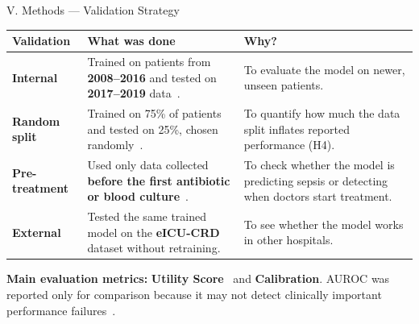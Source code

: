 \begin{frame}{V. Methods --- Validation Strategy}
\tablestyle
\begin{center}
\begin{tabular}{p{2cm}p{6cm}p{4.5cm}}
\toprule
\textbf{Validation} & \textbf{What was done} & \textbf{Why?} \\
\midrule
\textbf{Internal}
  & Trained on patients from \textbf{2008--2016} and tested on
    \textbf{2017--2019} data~\cite{guo2022temporal}.
  & To evaluate the model on newer, unseen patients. \\[3pt]
\textbf{Random split}
  & Trained on 75\% of patients and tested on 25\%, chosen
    randomly~\cite{guo2022temporal}.
  & To quantify how much the data split inflates reported
    performance (H4). \\[3pt]
\textbf{Pre-treatment}
  & Used only data collected \textbf{before the first antibiotic or blood
    culture}~\cite{kamran2024evaluation}.
  & To check whether the model is predicting sepsis or detecting when
    doctors start treatment. \\[3pt]
\textbf{External}
  & Tested the same trained model on the
    \textbf{eICU-CRD}~\cite{pollard2018eicu} dataset without retraining.
  & To see whether the model works in other hospitals. \\
\bottomrule
\end{tabular}
\end{center}

\vspace{4pt}
\textbf{Main evaluation metrics:} \textbf{Utility
Score}~\cite{reyna2020utility} and \textbf{Calibration}. AUROC was reported
only for comparison because it may not detect clinically important
performance failures~\cite{wang2025srpm}.
\end{frame}



